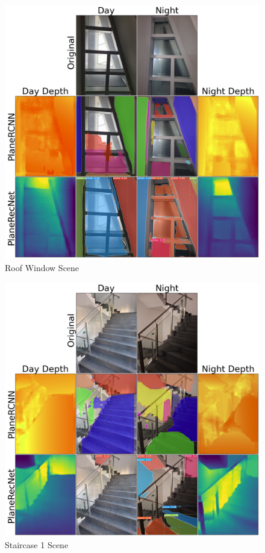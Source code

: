 \begin{figure}[H]
    \centering
    \includegraphics[width=1.0\textwidth]{images/results/RoofWindow.png}
    \caption{Roof Window Scene}
    \label{figure:RoofWindow}
\end{figure}

\begin{figure}[H]
    \centering
    \includegraphics[width=1.0\textwidth]{images/results/Staircase_1.png}
    \caption{Staircase 1 Scene}
    \label{figure:Staircase_1}
\end{figure}

